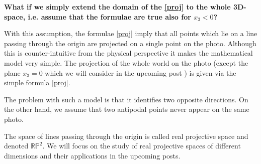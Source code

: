 \documentclass[a4paper,10pt]{article}
\begin{document}
{\bf What if we simply extend the domain of the \eqref{proj} to the whole 3D-space, i.e. assume that the formulae are true also for $x_3 < 0$?} 

With this assumption, the formulae \eqref{proj} imply that all points which lie on a line passing through the origin are projected on a single point on the photo. Although this is counter-intuitive  from the physical perspective it makes the mathematical model very simple. The projection of the whole world on the photo (except the plane $x_3=0$ which we will consider in the upcoming post ) is given via the simple formula \eqref{proj}. 

The problem with such a model is that it identifies two opposite directions. On the other hand, we assume that two antipodal points never appear on the same photo.

The space of lines passing through the origin is called real projective space and denoted $\mathbb{RP}^2$. We will focus on the study of real projective spaces of different dimensions and their applications in the upcoming posts.
\end{document}
